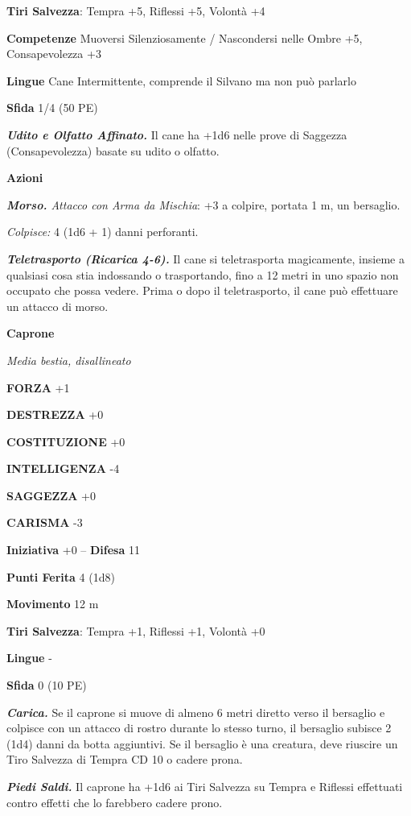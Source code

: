 \begin{multicols}{2}
\textbf{Tiri Salvezza}:  Tempra +5, Riflessi +5, Volontà +4

\textbf{Competenze} Muoversi Silenziosamente / Nascondersi nelle Ombre +5, Consapevolezza +3

\textbf{Lingue} Cane Intermittente, comprende il Silvano ma non può parlarlo

\textbf{Sfida} 1/4 (50 PE)

\emph{\textbf{Udito e Olfatto Affinato.}} Il cane ha +1d6 nelle prove di Saggezza (Consapevolezza) basate su udito o olfatto.

\textbf{Azioni}

\emph{\textbf{Morso.} Attacco con Arma da Mischia}: +3 a colpire, portata 1 m, un bersaglio.

\emph{Colpisce:} 4 (1d6 + 1) danni perforanti.

\emph{\textbf{Teletrasporto (Ricarica 4-6).}} Il cane si teletrasporta magicamente, insieme a qualsiasi cosa stia indossando o trasportando, fino a 12 metri in uno spazio non occupato che possa vedere. Prima o dopo il teletrasporto, il cane può effettuare un attacco di morso.

\medskip\textbf{Caprone}

\emph{Media bestia, disallineato}

\textbf{FORZA} +1

\textbf{DESTREZZA} +0

\textbf{COSTITUZIONE} +0

\textbf{INTELLIGENZA} -4

\textbf{SAGGEZZA} +0

\textbf{CARISMA} -3

\textbf{Iniziativa} +0 -- \textbf{Difesa} 11

\textbf{Punti Ferita} 4 (1d8)

\textbf{Movimento} 12 m

\textbf{Tiri Salvezza}: Tempra +1, Riflessi +1, Volontà +0 

\textbf{Lingue} -

\textbf{Sfida} 0 (10 PE)

\emph{\textbf{Carica.}} Se il caprone si muove di almeno 6 metri diretto verso il bersaglio e colpisce con un attacco di rostro durante lo stesso turno, il bersaglio subisce 2 (1d4) danni da botta aggiuntivi. Se il bersaglio è una creatura, deve riuscire un Tiro Salvezza di Tempra CD 10
o cadere prona.

\emph{\textbf{Piedi Saldi.}} Il caprone ha +1d6 ai Tiri Salvezza su Tempra e Riflessi effettuati contro effetti che lo farebbero cadere prono.


\end{multicols}
